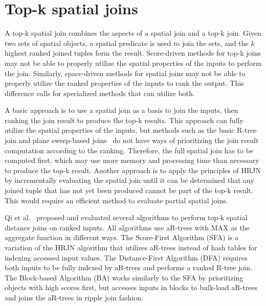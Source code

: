
\section{Top-k spatial joins}

A top-k spatial join combines the aspects of a spatial join and a top-k join. Given two sets of spatial objects, a spatial predicate is used to join the sets, and the \(k\) highest ranked joined tuples form the result. Score-driven methods for top-k joins may not be able to properly utilize the spatial properties of the inputs to perform the join. Similarly, space-driven methods for spatial joins may not be able to properly utilize the ranked properties of the inputs to rank the output. This difference calls for specialized methods that can utilize both.

A basic approach is to use a spatial join as a basis to join the inputs, then ranking the join result to produce the top-k results. This approach can fully utilize the spatial properties of the inputs, but methods such as the basic R-tree join and plane sweep-based joins~\cite{arge1998scalable} do not have ways of prioritizing the join result computation according to the ranking. Therefore, the full spatial join has to be computed first, which may use more memory and processing time than necessary to produce the top-k result. Another approach is to apply the principles of HRJN by incrementally evaluating the spatial join until it can be determined that any joined tuple that has not yet been produced cannot be part of the top-k result. This would require an efficient method to evaluate partial spatial joins.

Qi et al.~\cite{qi2013efficient} proposed and evaluated several algorithms to perform top-k spatial distance joins on ranked inputs. All algorithms use aR-trees with MAX as the aggregate function in different ways. The Score-First Algorithm (SFA) is a variation of the HRJN algorithm that utilizes aR-trees instead of hash tables for indexing accessed input values. The Distance-First Algorithm (DFA) requires both inputs to be fully indexed by aR-trees and performs a ranked R-tree join. The Block-based Algorithm (BA) works similarly to the SFA by prioritizing objects with high scores first, but accesses inputs in blocks to bulk-load aR-trees and joins the aR-trees in ripple join fashion.


